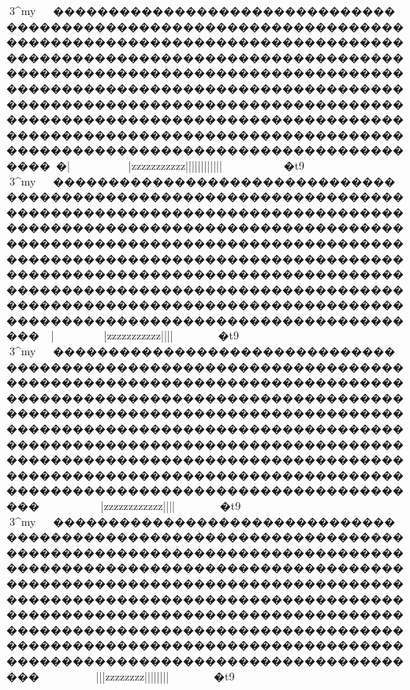 {{{{{{{{{{{{{{{{{{{{{{{{{{{{{{{{{{{{{{{{{{{{{{{{{{{{{{{{{{{{{{{{{{{{{{{{{{{{{{{{{{{{{{{{{{{{{{{{{{{{{{{{{{{{{{{{{{{{{{{{{{{{{{{{{{{{{{{{{{{{{{{{{{{{{{{{{{{{{{{{{{{{{{{{{{{{{{{{{{{{{{{{{{{{{{{{{{{{{{{{{{{{{{{{{{{{{{{{{{{{{{{{{{{{{{{{{{{{{{{{{{{{{{{{{{{{{{{{{{{{{{{{{{{{{{{{{{{{{{{{{{{{{{{{{{{{{{{{{{{{{{{{{{{{{{{{{{{{{{{{{{{{{{{{{{{{{{{{{{{{{{{{{{{{{{{{{{{{{{{{{{{{{{{{{{{{{{{{{{{{{{{{{{{{{{{{{{{{{{{{{{{{{{{{{{{{{{{{{{{{{{{{{{{{{{{{{{{{{{{{{{{{{{{{{{{{{{{{{{{{{{{{{{{{{{{{{{{{{{{{{{{{{{{{{{{{{{{{{{{{{{{{{{{{{{{{{{{{{{{{{{{{{{{{{{{{{{{{{{{{{{{3^my{}~~�����������������������������������������������������������������������������������������������������������������������������������������������������������������������������������������������������������������������������������������������������������������������������������������������������������������������������������������������������������������������~�|~}}}}~~~~~~~~~}|{{{{{{{{{{{{{{{{{{{{{zzzzzzzzzzz{{{{{{{{{||||||||{{{{||||}}}}}}}}~~~~~~~~~~�t9

3^my{}~~����������������������������������������������������������������������������������������������������������������������������������������������������������������������������������������������������������������������������������������������������������������������������������������������������������������������������������������������������������������������~|}~}}}}~~~~~~~~}}|{{{{{{{{{{{{{{{{{{{{{zzzzzzzzzzz{{{{{{{{{{{{{{{{{{{{{||||}}}}}}}}~~~~~~~}}}�t9

3^my{}~~����������������������������������������������������������������������������������������������������������������������������������������������������������������������������������������������������������������������������������������������������������������������������������������������������������������������������������������������������������������������~}}~}}}}~~~~~~~~}}|{{{{{{{{{{{{{{{{{{{{{zzzzzzzzzzzz{{{{{{{{{{{{{{{{{{{{||||}}}}}}}}~~~~~~~}}}�t9

3^my{}~~����������������������������������������������������������������������������������������������������������������������������������������������������������������������������������������������������������������������������������������������������������������������������������������������������������������������������������������������������������������������~}}~~~~~~~}}}}}|||{{{{{{{{{{{{{{{{{{{{zzzzzzzz{{{{||||{{{{{{{{{{{{{{{{||||}}}}}}}}~~~~~~~}}}�t9

}}}}}}}}}}}}}}}}}}}}}}}}}}}}}}}}}}}}}}}}}}}}}}}}}}}}}}}}}}}}}}}}}}}}}}}}}}}}}}}}}}}}}}}}}}}}}}}}}}}}}}}}}}}}}}}}}}}}}}}}}}}}}}}}}}}}}}}}}}}}}}}}}}}}}}}}}}}}}}}}}}}}}}}}}}}}}}}}}}}}}}}}}}}}}}}}}}}}}}}}}}}}}}}}}}}}}}}}}}}}}}}}}}}}}}}}}}}}}}}}}}}}}}}}}}}}}}}}}}}}}}}}}}}}}}}}}}}}}}}}}}}}}}}}}}}}}}}}}}}}}}}}}}}}}}}}}}}}}}}}}}}}}}}}}}}}}}}}}}}}}}}}}}}}}}}}}}}}}}}}}}}}}}}}}}}}}}}}}}}}}}}}}}}}}}}}}}}}}}}}}}}}}}}}}}}}}}}}}}}}}}}}}}}}}}}}}}}}}}}}}}}}}}}}}}}}}}}}}}}}}}}}}}}}}}}}}}}}}}}}}}}}}}}}}}}}}}}}}}}}}}}}}}}}}}}}}}}}}}}}}}}}}}}}}}}}}}}}}}}}}}}}}}}}}}}}}}}}}}}}}}}}}}}}}}}}}}}}}}}}}}}}}}}}}}}}}}}}}}}}}}}}}}}}}}}}}}}}}}}}}}}}}}}}}}}}

